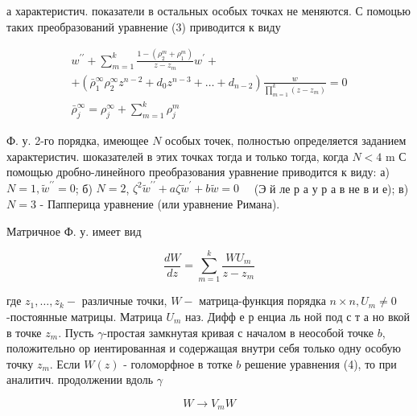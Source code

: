 \documentclass[10pt]{article}
\begin{document}
а характеристич. показатели в остальных особых точках не меняются. С помоцью таких преобразований уравнение (3) приводится к виду



\[

\begin{gathered}

w^{\prime \prime}+\sum_{m=1}^{k} \frac{1-\left(\rho_{2}^{m}+\rho_{1}^{m}\right)}{z-z_{m}} w^{\prime}+ \\

+\left(\bar{\rho}_{1}^{\infty} \rho_{2}^{\infty} z^{n-2}+d_{0} z^{n-3}+\ldots+d_{n-2}\right) \frac{w}{\prod_{m=1}^{k}\left(z-z_{m}\right)}=0 \\

\bar{\rho}_{j}^{\infty}=\rho_{j}^{\infty}+\sum_{m=1}^{k} \rho_{j}^{m}

\end{gathered}

\]



Ф. у. 2-го порядка, имеющее $N$ особых точек, полностью определяется заданием характеристич. шоказателей в этих точках тогда и только тогда, когда $N<4$ m С помощью дробно-линейного преобразования уравнение приводится к виду: а) $N=1, \tilde{w}^{\prime \prime}=0$; б) $N=2$, $\zeta^{2} \tilde{w}^{\prime \prime}+a \zeta \tilde{w}^{\prime}+b \tilde{w}=0 \quad$ (Э й ле р а у р а в не в и е); в) $N=3$ - Папперица уравнение (или уравнение Римана).



Матричное Ф. у. имеет вид



\[

\frac{d W}{d z}=\sum_{m=1}^{k} \frac{W U_{m}}{z-z_{m}}

\]



где $z_{1}, \ldots, z_{k}-$ различные точки, $W-$ матрица-функция порядка $n \times n, U_{m} \neq 0$-постоянные матрицы. Матрица $U_{m}$ наз. Дифф е р енциа ль ной под с т а но вкой в точке $z_{m}$. Пусть $\gamma$-простая замкнутая кривая с началом в неособой точке $b$, положительно ор иентированная и содержащая внутри себя только одну особую точку $z_{m}$. Если $W(z)$ - голоморфное в тотке $b$ решение уравнения (4), то при аналитич. продолжении вдоль $\gamma$



\[

W \rightarrow V_{m} W

\]
\end{document}
